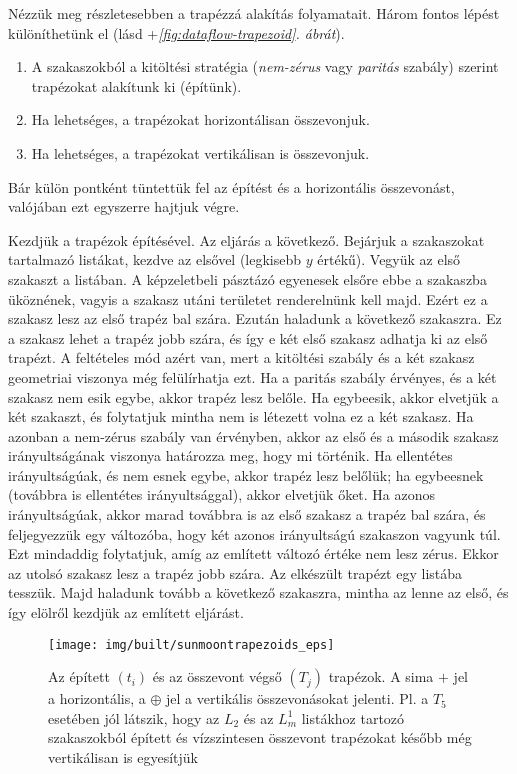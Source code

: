 \documentclass[12pt]{report}
\theoremstyle{definition}
\begin{document}
Nézzük meg részletesebben a trapézzá alakítás folyamatait. Három fontos lépést
különíthetünk el (lásd \az+\emph{\ref{fig:dataflow-trapezoid}. ábrát}).
  \begin{enumerate}
    \item A szakaszokból a kitöltési stratégia (\emph{nem-zérus} vagy
    \emph{paritás} szabály) szerint trapézokat alakítunk ki (építünk).
    \item Ha lehetséges, a trapézokat horizontálisan összevonjuk.
    \item Ha lehetséges, a trapézokat vertikálisan is összevonjuk.
  \end{enumerate}
Bár külön pontként tüntettük fel az építést és a horizontális összevonást,
valójában ezt egyszerre hajtjuk végre.

Kezdjük a trapézok építésével. Az eljárás a következő. Bejárjuk a szakaszokat
tartalmazó listákat, kezdve az elsővel (legkisebb $y$ értékű). Vegyük az első
szakaszt a listában. A képzeletbeli pásztázó egyenesek elsőre ebbe a szakaszba
üköznének, vagyis a szakasz utáni területet renderelnünk kell majd. Ezért ez a
szakasz lesz az első trapéz bal szára. Ezután haladunk a következő szakaszra.
Ez a szakasz lehet a trapéz jobb szára, és így e két első szakasz adhatja ki az
első trapézt. A feltételes mód azért van, mert a kitöltési szabály és a két
szakasz geometriai viszonya még felülírhatja ezt. Ha a paritás szabály
érvényes, és a két szakasz nem esik egybe, akkor trapéz lesz belőle. Ha
egybeesik, akkor elvetjük a két szakaszt, és folytatjuk mintha nem is létezett
volna ez a két szakasz. Ha azonban a nem-zérus szabály van érvényben, akkor az
első és a második szakasz irányultságának viszonya határozza meg, hogy mi
történik. Ha ellentétes irányultságúak, és nem esnek egybe, akkor trapéz lesz
belőlük; ha egybeesnek (továbbra is ellentétes irányultsággal), akkor elvetjük
őket. Ha azonos irányultságúak, akkor marad továbbra is az első szakasz a
trapéz bal szára, és feljegyezzük egy változóba, hogy két azonos irányultságú
szakaszon vagyunk túl. Ezt mindaddig folytatjuk, amíg az említett változó
értéke nem lesz zérus. Ekkor az utolsó szakasz lesz a trapéz jobb szára. Az
elkészült trapézt egy listába tesszük. Majd haladunk tovább a következő
szakaszra, mintha az lenne az első, és így elölről kezdjük az említett
eljárást.

  \begin{figure}
    \centering \texttt{[image: img/built/sunmoontrapezoids\_eps]}
    \caption{\label{fig:sunmoontrapezoids} Az épített $(t_i)$ és az összevont végső
    $(T_j)$ trapézok. A sima $+$ jel a horizontális, a $\oplus$ jel a
    vertikális összevonásokat jelenti. Pl. a $T_5$ esetében jól látszik, hogy
    az $L_2$ és az $L_m^1$ listákhoz tartozó szakaszokból épített és
    vízszintesen összevont trapézokat később még vertikálisan is egyesítjük}
  \end{figure}
\end{document}
